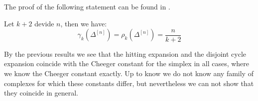 The proof of the following statement can be found in \cite{6}.

\begin{thm}
Let \(k+2\) devide \(n\), then we have:
\[
\gamma_k(\Delta^{[n]})=\rho_k(\Delta^{[n]})=\frac{n}{k+2}
\]
\end{thm}

By the previous results we see that the hitting expansion and the disjoint cycle expansion coincide with the Cheeger constant for the simplex in all cases, where we know the Cheeger constant exactly. Up to know we do not know any family of complexes for which these constants differ, but nevertheless we can not show that they coincide in general.